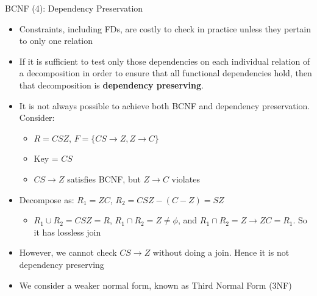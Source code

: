 \documentclass[aspectratio=169, xcolor=dvipsnames]{beamer}
\begin{document}
\begin{frame}{BCNF (4): Dependency Preservation}
    \begin{itemize}[<+->]
        \item Constraints, including FDs, are costly to check in practice unless they pertain to only one relation
        \item If it is sufficient to test only those dependencies on each individual relation of a decomposition in order to ensure that all functional dependencies hold, then that decomposition is \textbf{dependency preserving}.
        \item It is not always possible to achieve both BCNF and dependency preservation. Consider:
        \begin{itemize}
            \item[$\triangleright$] $R = CSZ$, $F = \{CS \rightarrow Z, Z \rightarrow C\}$
            \item[$\triangleright$] Key = $CS$
            \item[$\triangleright$] $CS \rightarrow Z$ satisfies BCNF, but $Z \rightarrow C$ violates
        \end{itemize}
        \item Decompose as: $R_1 = ZC$, $R_2 = CSZ - (C - Z) = SZ$
        \begin{itemize}
            \item[$\triangleright$] $R_1 \cup R_2 = CSZ = R$, $R_1 \cap R_2 = Z \neq \phi$, and $R_1 \cap R_2 = Z \rightarrow ZC = R_1$. So it has lossless join
        \end{itemize}
        \item However, we cannot check $CS \rightarrow Z$ without doing a join. Hence it is not dependency preserving
        \item We consider a weaker normal form, known as Third Normal Form (3NF)
    \end{itemize}
\end{frame}
\end{document}
